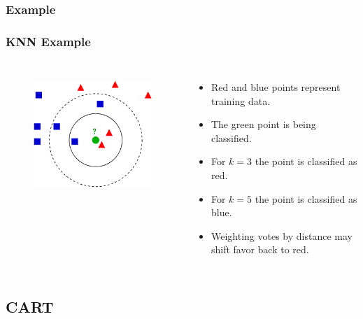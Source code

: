 \documentclass[mathserif]{beamer}
\begin{document}
	\subsubsection{Example}
	\begin{frame}
		\frametitle{KNN Example}
		\begin{columns}[t]
			\begin{figure}
				\centering
				\includegraphics[keepaspectratio,scale=0.5]{KNN.png} \\ \vspace{5px}
			\end{figure}
			
			\begin{itemize}
				\item Red and blue points represent training data.
				\item The green point is being classified.
				\item For \(k=3\) the point is classified as red.
				\item For \(k=5\) the point is classified as blue.
				\item Weighting votes by distance may shift favor back to red.
			\end{itemize}
		\end{columns}
	\end{frame}
	
	\subsection{CART}
\end{document}
